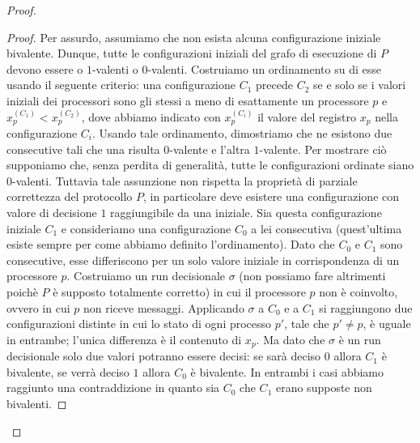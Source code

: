\documentclass{article}
\begin{document}
\begin{proof}
\begin{proof}
  Per assurdo, assumiamo che non esista alcuna configurazione iniziale
  bivalente. Dunque, tutte le configurazioni iniziali del grafo di
  esecuzione di $P$ devono essere o $1$-valenti o
  $0$-valenti. Costruiamo un ordinamento su di esse usando il seguente
  criterio: una configurazione $C_1$ precede $C_2$ se e solo se i
  valori iniziali dei processori sono gli stessi a meno di esattamente
  un processore $p$ e $x_p^{(C_1)} < x_p^{(C_2)}$, dove abbiamo
  indicato con $x_p^{(C_i)}$ il valore del registro $x_p$ nella
  configurazione $C_i$. Usando tale ordinamento, dimostriamo che ne
  esistono due consecutive tali che una risulta $0$-valente e l'altra
  $1$-valente. Per mostrare ciò supponiamo che, senza perdita di
  generalità, tutte le configurazioni ordinate siano
  $0$-valenti. Tuttavia tale assunzione non rispetta la propriet\`a di
  parziale correttezza del protocollo $P$, in particolare deve
  esistere una configurazione con valore di decisione $1$
  raggiungibile da una iniziale. Sia questa configurazione iniziale
  $C_1$ e consideriamo una configurazione $C_0$ a lei consecutiva
  (quest'ultima esiste sempre per come abbiamo definito
  l'ordinamento). Dato che $C_0$ e $C_1$ sono consecutive, esse
  differiscono per un solo valore iniziale in corrispondenza di un
  processore $p$. Costruiamo un run decisionale $\sigma$ (non possiamo
  fare altrimenti poichè $P$ è supposto totalmente corretto) in cui il
  processore $p$ non è coinvolto, ovvero in cui $p$ non riceve
  messaggi. Applicando $\sigma$ a $C_0$ e a $C_1$ si raggiungono due
  configurazioni distinte in cui lo stato di ogni processo $p'$, tale
  che $p'\neq p$, è uguale in entrambe; l'unica differenza è il
  contenuto di $x_p$. Ma dato che $\sigma$ è un run decisionale solo
  due valori potranno essere decisi: se sarà deciso $0$ allora $C_1$ è
  bivalente, se verrà deciso $1$ allora $C_0$ è bivalente. In entrambi
  i casi abbiamo raggiunto una contraddizione in quanto sia $C_0$ che
  $C_1$ erano supposte non bivalenti.


\end{proof}
 

\end{proof}
\end{document}

